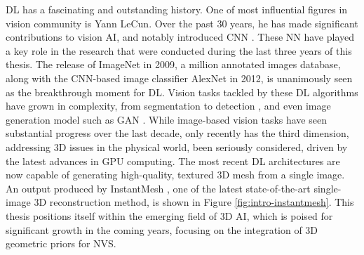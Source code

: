 \ac{DL} has a fascinating and outstanding history. One of most influential figures in vision community is Yann LeCun. Over the past 30 years, he has made significant contributions to vision \ac{AI}, and notably introduced \ac{CNN} \citep{lecun1998gradient}. These \ac{NN} have played a key role in the research that were conducted during the last three years of this thesis. The release of ImageNet \citep{deng2009imagenet} in 2009, a million annotated images database, along with the \ac{CNN}-based image classifier AlexNet \citep{krizhevsky2012imagenet} in 2012, is unanimously seen as the breakthrough moment for \ac{DL}. Vision tasks tackled by these \ac{DL} algorithms have grown in complexity, from segmentation \citep{long2015fully} to detection \citep{girshick2015fast}, and even image generation model such as \ac{GAN} \citep{goodfellow2014generative}. While image-based vision tasks have seen substantial progress over the last decade, only recently has the third dimension, addressing 3D issues in the physical world, been seriously considered, driven by the latest advances in \ac{GPU} computing. The most recent \ac{DL} architectures are now capable of generating high-quality, textured 3D mesh from a single image. An output produced by InstantMesh \citep{xu2024instantmesh}, one of the latest state-of-the-art single-image 3D reconstruction method, is shown in Figure \ref{fig:intro-instantmesh}. This thesis positions itself within the emerging field of 3D \ac{AI}, which is poised for significant growth in the coming years, focusing on the integration of 3D geometric priors for \ac{NVS}.  


